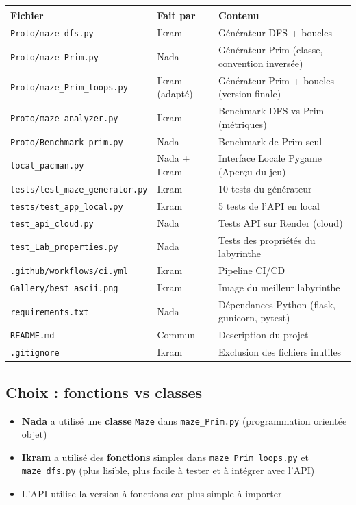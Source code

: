 \documentclass[12pt,a4paper]{article}
\begin{document}
\begin{center}
\begin{tabular}{lll}
\toprule
\textbf{Fichier} & \textbf{Fait par} & \textbf{Contenu} \\
\midrule
\texttt{Proto/maze\_dfs.py} & Ikram & Générateur DFS + boucles \\
\texttt{Proto/maze\_Prim.py} & Nada & Générateur Prim (classe, convention inversée) \\
\texttt{Proto/maze\_Prim\_loops.py} & Ikram (adapté) & Générateur Prim + boucles (version finale) \\
\texttt{Proto/maze\_analyzer.py} & Ikram & Benchmark DFS vs Prim (métriques) \\
\texttt{Proto/Benchmark\_prim.py} & Nada & Benchmark de Prim seul \\
\texttt{local_pacman.py} & Nada + Ikram & Interface Locale Pygame (Aperçu du jeu) \\
\texttt{tests/test\_maze\_generator.py} & Ikram & 10 tests du générateur \\
\texttt{tests/test\_app\_local.py} & Ikram & 5 tests de l'API en local \\
\texttt{test\_api\_cloud.py} & Nada & Tests API sur Render (cloud) \\
\texttt{test\_Lab\_properties.py} & Nada & Tests des propriétés du labyrinthe \\
\texttt{.github/workflows/ci.yml} & Ikram & Pipeline CI/CD \\
\texttt{Gallery/best\_ascii.png} & Ikram & Image du meilleur labyrinthe \\
\texttt{requirements.txt} & Nada & Dépendances Python (flask, gunicorn, pytest) \\
\texttt{README.md} & Commun & Description du projet \\
\texttt{.gitignore} & Ikram & Exclusion des fichiers inutiles \\
\bottomrule
\end{tabular}
\end{center}

\subsection{Choix : fonctions vs classes}

\begin{itemize}
    \item \textbf{Nada} a utilisé une \textbf{classe} \texttt{Maze} dans \texttt{maze\_Prim.py} (programmation orientée objet)
    \item \textbf{Ikram} a utilisé des \textbf{fonctions} simples dans \texttt{maze\_Prim\_loops.py} et \texttt{maze\_dfs.py} (plus lisible, plus facile à tester et à intégrer avec l'API)
    \item L'API utilise la version à fonctions car plus simple à importer
\end{itemize}
\end{document}
